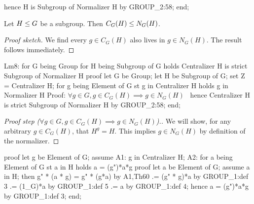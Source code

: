   hence H is Subgroup of Normalizer H by GROUP_2:58;
end;
\eatline
{}\nwendcode{}\nwdocspar
\begin{lemma}
Let $H\leq G$ be a subgroup. Then $C_{G}(H)\leq N_{G}(H)$.
\end{lemma}

\begin{proof}[Proof sketch]
We find every $g\in C_{G}(H)$ also lives in $g\in N_{G}(H)$. The result
follows immediately.
\end{proof}

\nwenddocs{}\endmoddef\nwstartdeflinemarkup{}\nwenddeflinemarkup
Lm8:
  for G being Group
  for H being Subgroup of G
  holds Centralizer H is strict Subgroup of Normalizer H
proof
  let G be Group;
  let H be Subgroup of G;
  set Z = Centralizer H;
  for g being Element of G st g in Centralizer H holds g in Normalizer H
  \LA{}Proof: $\forall g\in G, g\in C_{G}(H)\implies g\in N_{G}(H)$~{\nwtagstyle{}}\RA{}
  hence Centralizer H is strict Subgroup of Normalizer H by GROUP_2:58;
end;
\eatline
{}\nwendcode{}\nwdocspar
\begin{proof}[Proof step ($\forall g\in G, g\in C_{G}(H)\implies g\in N_{G}(H)$).]
We will show, for any arbitrary $g\in C_{G}(H)$, that $H^{g} = H$. This
implies $g\in N_{G}(H)$ by definition of the normalizer.
\end{proof}

\nwenddocs{}\endmoddef\nwstartdeflinemarkup{}\nwenddeflinemarkup
proof
  let g be Element of G;
  assume A1: g in Centralizer H;
  A2: for a being Element of G st a in H holds a = (g")*a*g
  proof
    let a be Element of G;
    assume a in H;
    then g" * (a * g) = g" * (g*a) by A1,Th60
                     .= (g" * g)*a by GROUP_1:def 3
                     .= (1_G)*a by GROUP_1:def 5
                     .= a by GROUP_1:def 4;
    hence a = (g")*a*g by GROUP_1:def 3;
  end;

